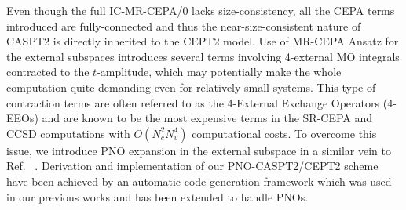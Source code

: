 \documentclass[aip,jcp,amsmath]{revtex4-1}
\begin{document}

%
Even though the full IC-MR-CEPA/0 lacks size-consistency, all the CEPA terms introduced are fully-connected and thus the near-size-consistent nature of CASPT2 is directly inherited to the CEPT2 model.
%
%
Use of MR-CEPA Ansatz for the external subspaces introduces several terms involving 4-external MO integrals contracted to the $t$-amplitude, which may potentially make the whole computation quite demanding even for relatively small systems.
%
This type of contraction terms are often referred to as the 4-External Exchange Operators (4-EEOs) and are known to be the most expensive terms in the SR-CEPA and CCSD computations with $O(N_c^2 N_v^4)$ computational costs.
%
To overcome this issue, we introduce PNO expansion in the external subspace in a similar vein to Ref. ~.
%
Derivation and implementation of our PNO-CASPT2/CEPT2 scheme have been achieved by an automatic code generation framework which was used in our previous works\cite{saitowmultireference2013,doi:10.1021/acs.jctc.5b00270} and has been extended to handle PNOs.
\end{document}
